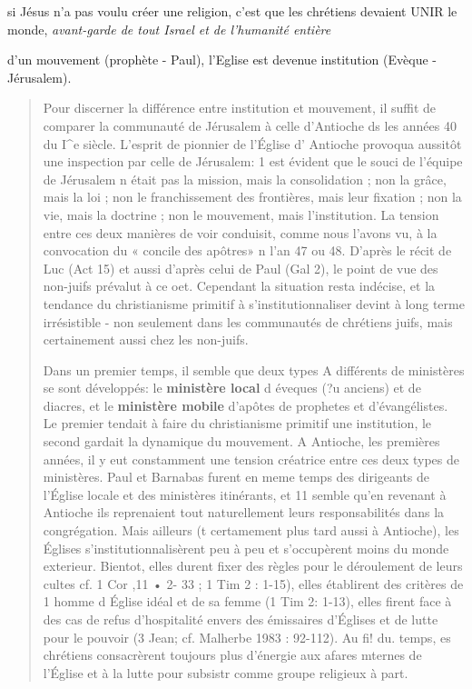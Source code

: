 \begin{Synthesis}
si Jésus n'a pas voulu créer une religion, c'est que les chrétiens devaient UNIR le monde, \textit{avant-garde de tout Israel et de l'humanité entière}

d'un mouvement (prophète - Paul), l'Eglise est devenue institution (Evèque - Jérusalem). 
\end{Synthesis}
\begin{quote} 
    Pour discerner la différence entre institution et mouvement, il suffit de comparer la communauté de Jérusalem à celle d'Antioche ds les
années 40 du I^{e} siècle. L'esprit de pionnier de l'Église d' Antioche
provoqua aussitôt une inspection par celle de Jérusalem: 1 est évident
que le souci de l'équipe de Jérusalem n était pas la mission, mais la
consolidation ; non la grâce, mais la loi ; non le franchissement des
frontières, mais leur fixation ; non la vie, mais la doctrine ; non le
mouvement, mais l'institution.
La tension entre ces deux manières de voir conduisit, comme nous
l'avons vu, à la convocation du « concile des apôtres» n l'an 47 ou
48. D'après le récit de Luc (Act 15) et aussi d'après celui de Paul (Gal
2), le point de vue des non-juifs prévalut à ce oet. Cependant la
situation resta indécise, et la tendance du christianisme  primitif à
s'institutionnaliser devint à long terme irrésistible - non seulement
dans les communautés de chrétiens juifs, mais certainement aussi chez
les non-juifs.

Dans un premier temps, il semble que deux types A différents de
ministères se sont développés: le\textbf{ ministère local} d éveques (?u anciens)
et de diacres, et le \textbf{ministère mobile } d'apôtes de prophetes et
d'évangélistes. Le premier tendait à faire du  christianisme  primitif une
institution, le second gardait la dynamique du mouvement. A Antioche,
les premières années, il y eut constamment une tension créatrice
entre ces deux types de ministères. Paul et Barnabas furent en meme
temps des dirigeants de l'Église locale et des ministères itinérants, et 11
semble qu'en revenant à Antioche ils reprenaient tout naturellement
leurs responsabilités dans la congrégation. Mais ailleurs (t certamement
plus tard aussi à Antioche), les Églises s'institutionnalisèrent peu
à peu et s'occupèrent moins du monde exterieur. Bientot, elles durent
fixer des règles pour le déroulement de leurs cultes cf. 1 Cor ,11 • 2-
33 ; 1 Tim 2 : 1-15), elles établirent des critères de 1 homme d Église
idéal et de sa femme (1 Tim 2: 1-13), elles firent face à des cas de
refus d'hospitalité envers des émissaires d'Églises et de lutte pour le
pouvoir (3 Jean; cf. Malherbe 1983 : 92-112). Au fi! du. temps, es
chrétiens consacrèrent toujours plus d'énergie aux afares mternes de
l'Église et à la lutte pour subsistr comme groupe religieux à part.



\end{quote}
